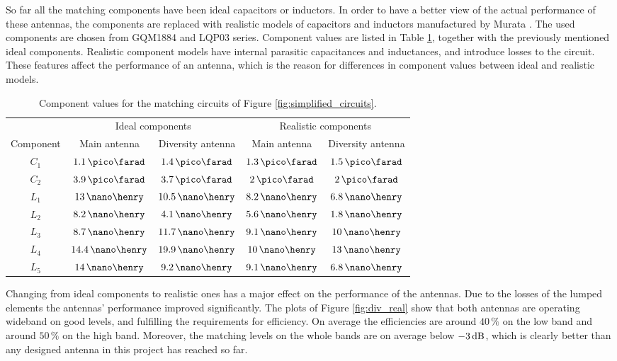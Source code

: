 So far all the matching components have been ideal capacitors or inductors. In order to have a better view of the actual performance of these antennas, the components are replaced with realistic models of capacitors and inductors manufactured by Murata \cite{murata}. The used components are chosen from GQM1884 \cite{murata_c} and LQP03 \cite{murata_l} series. Component values are listed in Table \ref{tab:match}, together with the previously mentioned ideal components. Realistic component models have internal parasitic capacitances and inductances, and introduce losses to the circuit. These features affect the performance of an antenna, which is the reason for differences in component values between ideal and realistic models.
\begin{table}[H]
    \centering
    \caption{Component values for the matching circuits of Figure \ref{fig:simplified_circuits}.}
    \label{tab:match}
    \begin{tabular}{|c|c|c|c|c|}
        \hline
         & \multicolumn{2}{|c|}{Ideal components} & \multicolumn{2}{|c|}{Realistic components} \\
         \cline{2-5}
         Component & Main antenna & Diversity antenna & Main antenna & Diversity antenna\\
         \hline
         $C_1$ & $1.1\,\pico\farad$ & $1.4\,\pico\farad$ & $1.3\,\pico\farad$ & $1.5\,\pico\farad$\\
         \hline
         $C_2$ & $3.9\,\pico\farad$ & $3.7\,\pico\farad$ & $2\,\pico\farad$ & $2\,\pico\farad$\\
         \hline
         $L_1$ & $13\,\nano\henry$ & $10.5\,\nano\henry$ & $8.2\,\nano\henry$ & $6.8\,\nano\henry$\\
         \hline
         $L_2$ & $8.2\,\nano\henry$ & $4.1\,\nano\henry$ & $5.6\,\nano\henry$ & $1.8\,\nano\henry$\\
         \hline
         $L_3$ & $8.7\,\nano\henry$ & $11.7\,\nano\henry$ & $9.1\,\nano\henry$ & $10\,\nano\henry$\\
         \hline
         $L_4$ & $14.4\,\nano\henry$ & $19.9\,\nano\henry$ & $10\,\nano\henry$ & $13\,\nano\henry$\\
         \hline
         $L_5$ & $14\,\nano\henry$ & $9.2\,\nano\henry$ & $9.1\,\nano\henry$ & $6.8\,\nano\henry$\\
         \hline
    \end{tabular}
\end{table}

Changing from ideal components to realistic ones has a major effect on the performance of the antennas. Due to the losses of the lumped elements the antennas' performance improved significantly. The plots of Figure \ref{fig:div_real} show that both antennas are operating wideband on good levels, and fulfilling the requirements for efficiency. On average the efficiencies are around $40\,\%$ on the low band and around $50\,\%$ on the high band. Moreover, the matching levels on the whole bands are on average below $-3\,\mathrm{dB}$, which is clearly better than any designed antenna in this project has reached so far.

